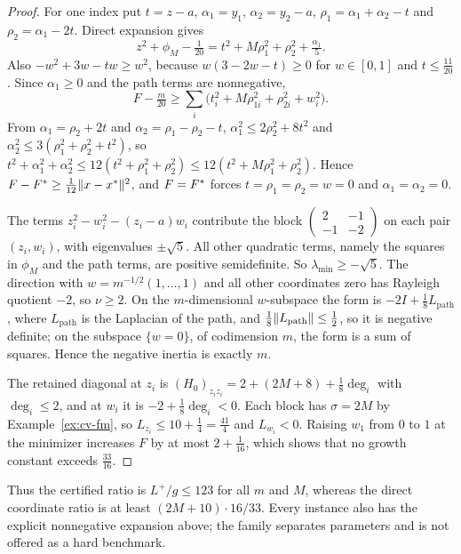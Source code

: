\begin{proof}
For one index put $t=z-a$, $\alpha_1=y_1$, $\alpha_2=y_2-a$,
$\rho_1=\alpha_1+\alpha_2-t$ and $\rho_2=\alpha_1-2t$. Direct expansion
gives
\[
z^2+\phi_M-\tfrac1{20}=t^2+M\rho_1^2+\rho_2^2+\tfrac{\alpha_1}5.
\]
Also $-w^2+3w-tw\ge w^2$, because $w(3-2w-t)\ge0$ for $w\in[0,1]$ and
$t\le\frac{11}{20}$. Since $\alpha_1\ge0$ and the path terms are
nonnegative,
\[
F-\tfrac m{20}\ge\sum_i\bigl(t_i^2+M\rho_{1i}^2+\rho_{2i}^2+w_i^2\bigr).
\]
From $\alpha_1=\rho_2+2t$ and $\alpha_2=\rho_1-\rho_2-t$,
$\alpha_1^2\le2\rho_2^2+8t^2$ and $\alpha_2^2\le3(\rho_1^2+\rho_2^2+t^2)$, so
$t^2+\alpha_1^2+\alpha_2^2\le12(t^2+\rho_1^2+\rho_2^2)\le12(t^2+M\rho_1^2+\rho_2^2)$.
Hence $F-F^{*}\ge\frac1{12}\lVert x-x^*\rVert^2$, and $F=F^{*}$ forces
$t=\rho_1=\rho_2=w=0$ and $\alpha_1=\alpha_2=0$.

The terms $z_i^2-w_i^2-(z_i-a)w_i$ contribute the block
$\left(\begin{smallmatrix}2&-1\\-1&-2\end{smallmatrix}\right)$ on each pair
$(z_i,w_i)$, with eigenvalues $\pm\sqrt5$. All other quadratic terms, namely
the squares in $\phi_M$ and the path terms, are positive semidefinite. So
$\lambda_{\min}\ge-\sqrt5$. The direction with $w=m^{-1/2}(1,\ldots,1)$ and
all other coordinates zero has Rayleigh quotient $-2$, so $\nu\ge2$. On the
$m$-dimensional $w$-subspace the form is $-2I+\frac18L_{\mathrm{path}}$, where
$L_{\mathrm{path}}$ is the Laplacian of the path, and
$\frac18\lVert L_{\mathrm{path}}\rVert\le\frac12$, so it is negative definite; on
the subspace $\{w=0\}$, of codimension $m$, the form is a sum of squares.
Hence the negative inertia is exactly $m$.

The retained diagonal at $z_i$ is
$(H_0)_{z_iz_i}=2+(2M+8)+\frac18\deg_i$ with $\deg_i\le2$, and at $w_i$ it
is $-2+\frac18\deg_i<0$. Each block has $\sigma=2M$ by
Example~\ref{ex:cv-fm}, so $L_{z_i}\le10+\frac14=\frac{41}4$ and
$L_{w_i}<0$. Raising $w_1$ from $0$ to $1$ at the minimizer increases $F$ by
at most $2+\frac1{16}$, which shows that no growth constant exceeds
$\frac{33}{16}$.
\end{proof}

Thus the certified ratio is $L^+/g\le123$ for all $m$ and $M$, whereas the
direct coordinate ratio is at least $(2M+10)\cdot16/33$. Every instance also
has the explicit nonnegative expansion above; the family separates
parameters and is not offered as a hard benchmark.

